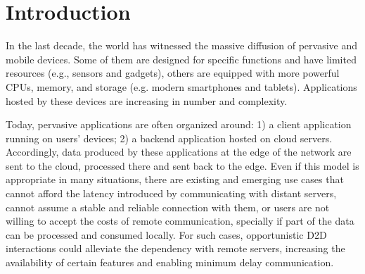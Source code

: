\section{Introduction}
\label{sec:intro}






In the last decade, the world has witnessed the massive diffusion of pervasive and mobile devices. Some of them are designed for specific functions and have limited resources (e.g., sensors and gadgets), others are equipped with more powerful CPUs, memory, and storage (e.g. modern smartphones and tablets). Applications hosted by these devices are increasing in number and complexity.

%


Today, pervasive applications are often organized around: 1) a client application running on users' devices; 2) a backend application hosted on cloud servers. Accordingly, data produced by these applications at the edge of the network are sent to the cloud, processed there and sent back to the edge. Even if this model is appropriate in many situations, there are existing and emerging use cases that cannot afford the latency introduced by communicating with distant servers, cannot assume a stable and reliable connection with them, or users are not willing to accept the costs of remote communication, specially if part of the data can be processed and consumed locally. For such cases, opportunistic D2D interactions could alleviate the dependency with remote servers, increasing the availability of certain features and enabling minimum delay communication.


